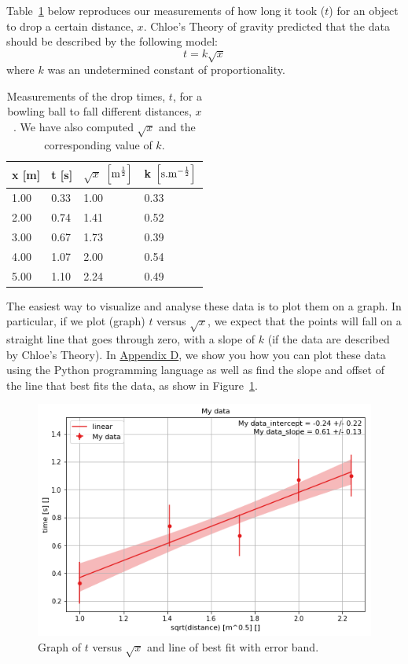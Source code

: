 Table~\ref{tab:modelandexperiment:kmes2} below reproduces our measurements of how long it took ($t$) for an object to drop a certain distance, $x$.  Chloe's Theory of gravity predicted that the data should be described by the following model:
\begin{equation}
t = k \sqrt{x}
\end{equation}
where $k$ was an undetermined constant of proportionality.

\begin{table}
\centering
\caption[]{Measurements of the drop times, $t$, for a bowling ball to fall different distances, $x$. We have also computed $\sqrt x$ and the corresponding value of $k$.}
\label{tab:modelandexperiment:kmes2}
\begin{tabular}{p{}p{}p{}p{}}
\toprule
\textbf{x} [m] & \textbf{t} [s] & \textbf{$\sqrt x$}  ${\rm \left[{m^{\frac{1}{2}}}\right]}$ & \textbf{k}  ${\rm \left[{s.m^{ -\frac{1}{2}}}\right]}$ \\
\hline
1.00 & 0.33 & 1.00 & 0.33 \\
2.00 & 0.74 & 1.41 & 0.52 \\
3.00 & 0.67 & 1.73 & 0.39 \\
4.00 & 1.07 & 2.00 & 0.54 \\
5.00 & 1.10 & 2.24 & 0.49 \\
\bottomrule
\end{tabular}
\end{table}

The easiest way to visualize and analyse these data is to plot them on a graph. In particular, if we plot (graph) $t$ versus $\sqrt{x}$, we  expect that the points will fall on a straight line that goes through zero, with a slope of $k$ (if the data are described by Chloe's Theory). In \href{\#app:python}{Appendix D}, we show you how you can plot these data using the Python programming language as well as find the slope and offset of the line that best fits the data, as show in Figure~\ref{fig:modelandexperiment:tvssqx}.

\begin{figure}[!htbp]
\centering
\includegraphics[width=0.75\linewidth]{files/tvssqx-1a7c2fcaca59bc03d2d4e404d143d11a.png}
\caption[]{Graph of $t$ versus $\sqrt{x}$ and line of best fit with error band.}
\label{fig:modelandexperiment:tvssqx}
\end{figure}


